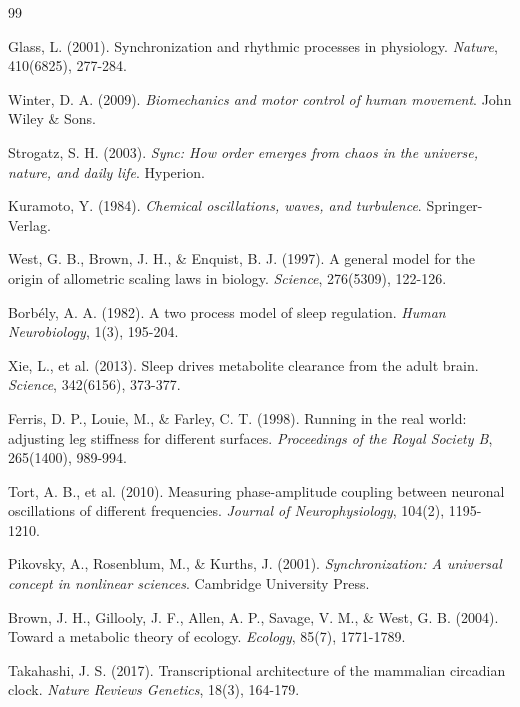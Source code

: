 \documentclass[12pt,twocolumn]{article}
\begin{document}

\begin{thebibliography}{99}

Glass, L. (2001). Synchronization and rhythmic processes in physiology. \textit{Nature}, 410(6825), 277-284.

Winter, D. A. (2009). \textit{Biomechanics and motor control of human movement}. John Wiley \& Sons.

Strogatz, S. H. (2003). \textit{Sync: How order emerges from chaos in the universe, nature, and daily life}. Hyperion.

Kuramoto, Y. (1984). \textit{Chemical oscillations, waves, and turbulence}. Springer-Verlag.

West, G. B., Brown, J. H., \& Enquist, B. J. (1997). A general model for the origin of allometric scaling laws in biology. \textit{Science}, 276(5309), 122-126.

Borbély, A. A. (1982). A two process model of sleep regulation. \textit{Human Neurobiology}, 1(3), 195-204.

Xie, L., et al. (2013). Sleep drives metabolite clearance from the adult brain. \textit{Science}, 342(6156), 373-377.

Ferris, D. P., Louie, M., \& Farley, C. T. (1998). Running in the real world: adjusting leg stiffness for different surfaces. \textit{Proceedings of the Royal Society B}, 265(1400), 989-994.

Tort, A. B., et al. (2010). Measuring phase-amplitude coupling between neuronal oscillations of different frequencies. \textit{Journal of Neurophysiology}, 104(2), 1195-1210.

Pikovsky, A., Rosenblum, M., \& Kurths, J. (2001). \textit{Synchronization: A universal concept in nonlinear sciences}. Cambridge University Press.

Brown, J. H., Gillooly, J. F., Allen, A. P., Savage, V. M., \& West, G. B. (2004). Toward a metabolic theory of ecology. \textit{Ecology}, 85(7), 1771-1789.

Takahashi, J. S. (2017). Transcriptional architecture of the mammalian circadian clock. \textit{Nature Reviews Genetics}, 18(3), 164-179.


\end{thebibliography}
\end{document}
